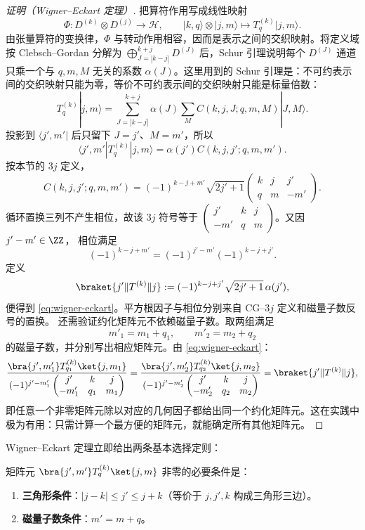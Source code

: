 \begin{proof}[证明（Wigner--Eckart 定理）]
把算符作用写成线性映射
\[
\Phi:D^{(k)}\otimes D^{(j)}\longrightarrow\mathcal H,
\qquad |k,q\rangle\otimes|j,m\rangle\longmapsto T^{(k)}_q|j,m\rangle.
\]
由张量算符的变换律，$\Phi$ 与转动作用相容，因而是表示之间的交织映射。将定义域按 Clebsch--Gordan 分解为 $\bigoplus_{J=|k-j|}^{k+j}D^{(J)}$ 后，Schur 引理说明每个 $D^{(J)}$ 通道只乘一个与 $q,m,M$ 无关的系数 $\alpha(J)$。这里用到的 Schur 引理是：不可约表示间的交织映射只能为零，等价不可约表示间的交织映射只能是标量倍数：
\begin{equation}
T^{(k)}_q|j,m\rangle=\sum_{J=|k-j|}^{k+j}\alpha(J)\sum_M C(k,j,J;q,m,M)|J,M\rangle.
\label{eq:tensor-op-expansion}
\end{equation}
投影到 $\langle j',m'|$ 后只留下 $J=j'$、$M=m'$，所以
\[
\langle j',m'|T^{(k)}_q|j,m\rangle=\alpha(j')C(k,j,j';q,m,m').
\]
按本节的 $3j$ 定义，
\[
C(k,j,j';q,m,m')=(-1)^{k-j+m'}\sqrt{2j'+1}
\begin{pmatrix}k&j&j'\\q&m&-m'\end{pmatrix}.
\]
循环置换三列不产生相位，故该 $3j$ 符号等于
$\begin{pmatrix}j'&k&j\\-m'&q&m\end{pmatrix}$。又因 $j'-m'\in\ZZ$，
相位满足
\[
(-1)^{k-j+m'}=(-1)^{j'-m'}(-1)^{k-j+j'}.
\]
定义
\[
\braket{j'\|T^{(k)}\|j}:=(-1)^{k-j+j'}\sqrt{2j'+1}\,\alpha(j'),
\]
便得到 \cref{eq:wigner-eckart}。平方根因子与相位分别来自 CG--$3j$ 定义和磁量子数反号的置换。
还需验证约化矩阵元不依赖磁量子数。取两组满足
\[
m'_1=m_1+q_1,
\qquad
m'_2=m_2+q_2
\]
的磁量子数，并分别写出相应矩阵元。由 \cref{eq:wigner-eckart}：
\[
\frac{\bra{j',m'_1}T^{(k)}_{q_1}\ket{j,m_1}}{(-1)^{j'-m'_1}\begin{pmatrix}j'&k&j\\-m'_1&q_1&m_1\end{pmatrix}}
=
\frac{\bra{j',m'_2}T^{(k)}_{q_2}\ket{j,m_2}}{(-1)^{j'-m'_2}\begin{pmatrix}j'&k&j\\-m'_2&q_2&m_2\end{pmatrix}}
=\braket{j'\|T^{(k)}\|j},
\]
即任意一个非零矩阵元除以对应的几何因子都给出同一个约化矩阵元。这在实践中极为有用：只需计算一个最方便的矩阵元，就能确定所有其他矩阵元。

\end{proof}\par\medskip
Wigner--Eckart 定理立即给出两条基本选择定则：
\begin{proposition}[角动量选择定则]
矩阵元 $\bra{j',m'}T^{(k)}_q\ket{j,m}$ 非零的必要条件是：
\begin{enumerate}
\item \textbf{三角形条件}：$|j-k|\le j'\le j+k$（等价于 $j,j',k$ 构成三角形三边）。
\item \textbf{磁量子数条件}：$m'=m+q$。
\end{enumerate}
\end{proposition}

